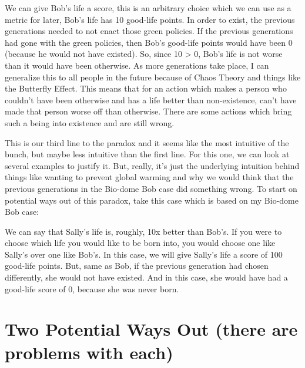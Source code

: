 We can give Bob's life a score, this is an arbitrary choice which we can use as a metric for later, Bob's life has 10 good-life points. In order to exist, the previous generations needed to not enact those green policies. If the previous generations had gone with the green policies, then Bob's good-life points would have been 0 (because he would not have existed). So, since 10 > 0, Bob's life is not worse than it would have been otherwise. As more generations take place, I can generalize this to all people in the future because of Chaos Theory and things like the Butterfly Effect. This means that for an action which makes a person who couldn't have been otherwise and has a life better than non-existence, can't have made that person worse off than otherwise. 
There are some actions which bring such a being into existence and are still wrong.

This is our third line to the paradox and it seems like the most intuitive of the bunch, but maybe less intuitive than the first line. For this one, we can look at several examples to justify it. But, really, it's just the underlying intuition behind things like wanting to prevent global warming and why we would think that the previous generations in the Bio-dome Bob case did something wrong. To start on potential ways out of this paradox, take this case which is based on my Bio-dome Bob case:

We can say that Sally's life is, roughly, 10x better than Bob's. If you were to choose which life you would like to be born into, you would choose one like Sally's over one like Bob's. In this case, we will give Sally's life a score of 100 good-life points. But, same as Bob, if the previous generation had chosen differently, she would not have existed. And in this case, she would have had a good-life score of 0, because she was never born. 

\section{Two Potential Ways Out (there are problems with each)}


